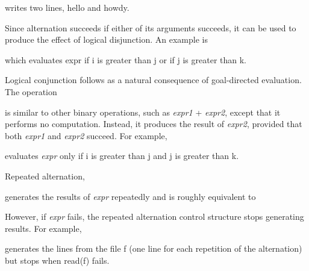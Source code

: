 

\noindent writes two lines, hello and howdy.

Since alternation succeeds if either of its arguments succeeds, it can
be used to produce the effect of logical disjunction. An example is



\noindent
which evaluates expr if i is greater than j or if j is greater than k.

Logical conjunction follows as a natural consequence of goal-directed
evaluation. The operation



\noindent is similar to other binary operations, such as
\textit{expr1} + \textit{expr2}, except that it performs no
computation. Instead, it produces the result of \textit{expr2},
provided that both
\textit{expr1} and \textit{expr2} succeed. For example,



\noindent
evaluates \textit{expr} only if i is greater than j and j is greater than k.

Repeated alternation,



\noindent
generates the results of \textit{expr }repeatedly and is roughly equivalent to



However, if \textit{expr} fails, the repeated alternation control
structure stops generating results. For example,



\noindent generates the lines from the file f (one line for each
repetition of the alternation) but stops when read(f) fails.


